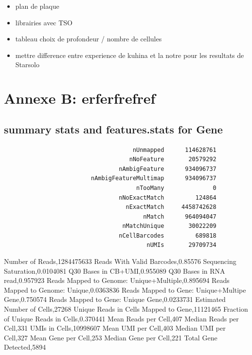 \documentclass[
  11pt,
  a4paper,
]{report}
\providecommand{\tightlist}{%
  \setlength{\itemsep}{0pt}\setlength{\parskip}{0pt}}\usepackage{longtable,booktabs,array}
\begin{document}
\begin{itemize}
\tightlist
\item
  plan de plaque
\item
  librairies avec TSO
\item
  tableau choix de profondeur / nombre de cellules
\item
  mettre difference entre experience de kuhina et la notre pour les
  resultats de Starsolo
\end{itemize}

\chapter{Annexe B: erferfrefref}\label{annexe-b}

\section{summary stats and features.stats for
Gene}\label{summary-stats-and-features.stats-for-gene}

\begin{verbatim}
                                     nUnmapped      114628761
                                    nNoFeature       20579292
                                 nAmbigFeature      934096737
                         nAmbigFeatureMultimap      934096737
                                      nTooMany              0
                                 nNoExactMatch         124864
                                   nExactMatch     4458742628
                                        nMatch      964094047
                                  nMatchUnique       30022209
                                 nCellBarcodes         689818
                                         nUMIs       29709734
\end{verbatim}

Number of Reads,1284475633 Reads With Valid Barcodes,0.85576 Sequencing
Saturation,0.0104081 Q30 Bases in CB+UMI,0.955089 Q30 Bases in RNA
read,0.957923 Reads Mapped to Genome: Unique+Multiple,0.895694 Reads
Mapped to Genome: Unique,0.0363836 Reads Mapped to Gene: Unique+Multipe
Gene,0.750574 Reads Mapped to Gene: Unique Gene,0.0233731 Estimated
Number of Cells,27268 Unique Reads in Cells Mapped to Gene,11121465
Fraction of Unique Reads in Cells,0.370441 Mean Reads per Cell,407
Median Reads per Cell,331 UMIs in Cells,10998607 Mean UMI per Cell,403
Median UMI per Cell,327 Mean Gene per Cell,253 Median Gene per Cell,221
Total Gene Detected,5894
\end{document}
